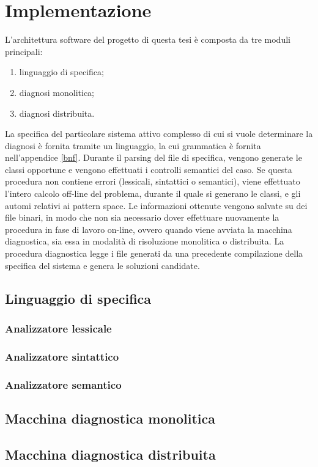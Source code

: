 \chapter{Implementazione}
L'architettura software del progetto di questa tesi è composta da tre moduli principali:
\begin{enumerate}
\item linguaggio di specifica;
\item diagnosi monolitica;
\item diagnosi distribuita.
\end{enumerate}
La specifica del particolare sistema attivo complesso di cui si vuole determinare la diagnosi è fornita tramite un linguaggio, la cui grammatica è fornita nell'appendice \ref{bnf}.
Durante il parsing del file di specifica, vengono generate le classi opportune e vengono effettuati i controlli semantici del caso. Se questa procedura non contiene errori (lessicali, sintattici o semantici), viene effettuato l'intero calcolo off-line del problema, durante il quale si generano le classi, e gli automi relativi ai pattern space. Le informazioni ottenute vengono salvate su dei file binari, in modo che non sia necessario dover effettuare nuovamente la procedura in fase di lavoro on-line, ovvero quando viene avviata la macchina diagnostica, sia essa in modalità di risoluzione monolitica o distribuita. 
La procedura diagnostica legge i file generati da una precedente compilazione della specifica del sistema e genera le soluzioni candidate. 

\section{Linguaggio di specifica}
\subsection{Analizzatore lessicale}

\subsection{Analizzatore sintattico}

\subsection{Analizzatore semantico}

\section{Macchina diagnostica monolitica}

\section{Macchina diagnostica distribuita}
